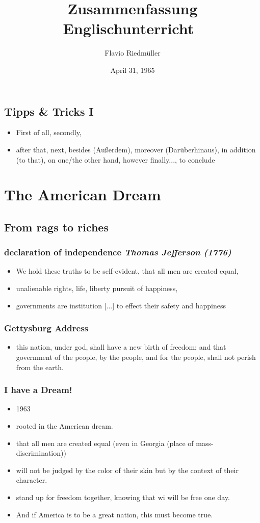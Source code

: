 \documentclass[a5paper,12pt,twoside,titlepage]{scrartcl}
\title{Zusammenfassung Englischunterricht\  \vspace{0.3cm} \small}
\author{Flavio Riedmüller}
\date{April 31, 1965}
\begin{document}
\maketitle	
\tableofcontents
\setcounter{section}{0}
\subsection{Tipps \& Tricks I}
	\begin{itemize}
		\item 
		\subitem First of all, secondly, 
		\item 
		\subitem after that, next, besides (Außerdem), moreover (Darüberhinaus), in addition (to that), on one/the other hand, however
		\subitem finally..., to conclude
	\end{itemize}
\section{The American Dream}
	\subsection{From rags to riches}
		\subsubsection{declaration of independence \it Thomas Jefferson (1776)}
			\begin{itemize}
			\item We hold these truths to be self-evident, that all men are created equal, 
			\item unalienable rights, life, liberty pursuit of happiness, 
			\item governments are institution [...] to effect their safety and happiness
			\end{itemize}
		\subsubsection{Gettysburg Address}
			\begin{itemize}
				\item this nation, under god, shall have a new birth of freedom; and that government of the people, by the people, and for the people, shall not perish from the earth.
			\end{itemize}
		\subsubsection{I have a Dream!}
			\begin{itemize}
				\item 1963
				\item rooted in the American dream.
				\item that all men are created equal (\textrightarrow even in Georgia (place of mass-discrimination))
				\item will not be judged by the color of their skin but by the context of their character.
				\item stand up for freedom together, knowing that wi will be free one day.
				\item And if America is to be a great nation, this must become true.
			\end{itemize} 
\end{document}
